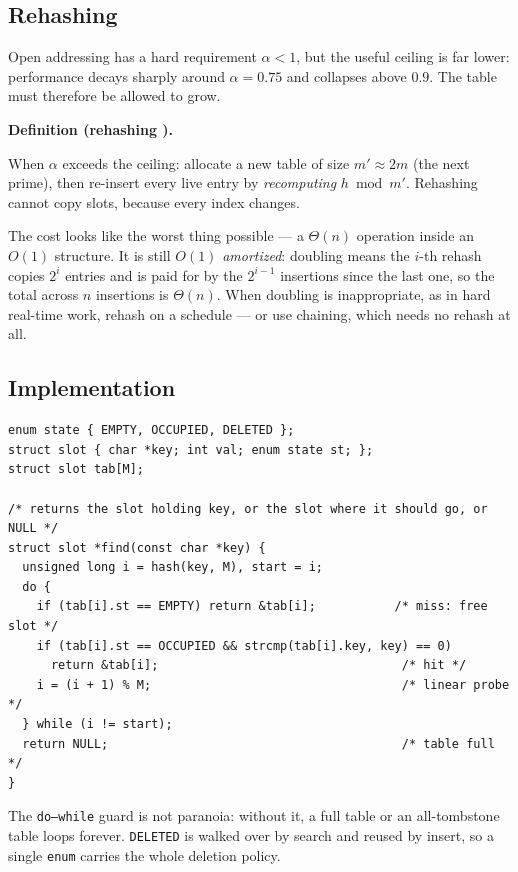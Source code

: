 \documentclass[11pt]{article}
\newenvironment{definitionbox}[1]{%
  \par\noindent\textbf{Definition (#1).}\ \itshape
}{\par\vspace{0.3em}}
\begin{document}
\subsection{Rehashing}

Open addressing has a hard requirement $\alpha < 1$, but the useful ceiling is far lower: performance decays sharply around $\alpha = 0.75$ and collapses above $0.9$. The table must therefore be allowed to grow.

\begin{definitionbox}{rehashing \cite{Sedgewick2011_algorithms}}
When $\alpha$ exceeds the ceiling: allocate a new table of size $m' \approx 2m$ (the next prime), then re-insert every live entry by \emph{recomputing} $h \bmod m'$. Rehashing cannot copy slots, because every index changes.
\end{definitionbox}

The cost looks like the worst thing possible --- a $\Theta(n)$ operation inside an $O(1)$ structure. It is still $O(1)$ \emph{amortized}: doubling means the $i$-th rehash copies $2^i$ entries and is paid for by the $2^{i-1}$ insertions since the last one, so the total across $n$ insertions is $\Theta(n)$. When doubling is inappropriate, as in hard real-time work, rehash on a schedule --- or use chaining, which needs no rehash at all.

\subsection{Implementation}

\begin{verbatim}
enum state { EMPTY, OCCUPIED, DELETED };
struct slot { char *key; int val; enum state st; };
struct slot tab[M];

/* returns the slot holding key, or the slot where it should go, or NULL */
struct slot *find(const char *key) {
  unsigned long i = hash(key, M), start = i;
  do {
    if (tab[i].st == EMPTY) return &tab[i];           /* miss: free slot */
    if (tab[i].st == OCCUPIED && strcmp(tab[i].key, key) == 0)
      return &tab[i];                                  /* hit */
    i = (i + 1) % M;                                   /* linear probe */
  } while (i != start);
  return NULL;                                         /* table full */
}
\end{verbatim}

The \texttt{do--while} guard is not paranoia: without it, a full table or an all-tombstone table loops forever. \texttt{DELETED} is walked over by search and reused by insert, so a single \texttt{enum} carries the whole deletion policy.
\end{document}
